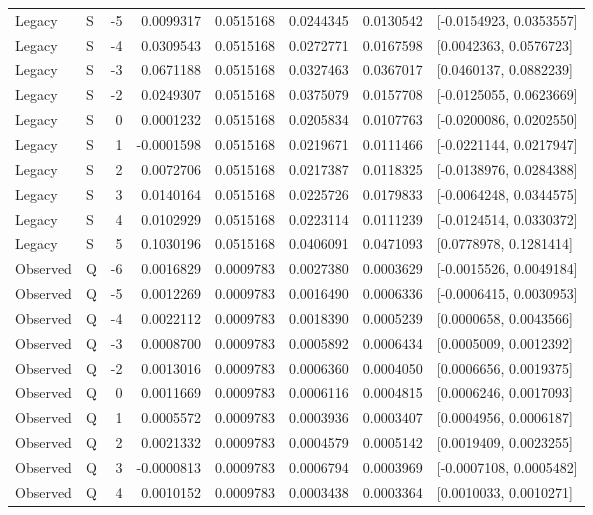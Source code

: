 {\begin{longtable}{llrrrrrl}
Legacy & S & -5 & 0.0099317 & 0.0515168 & 0.0244345 & 0.0130542 & [-0.0154923, 0.0353557]\\
Legacy & S & -4 & 0.0309543 & 0.0515168 & 0.0272771 & 0.0167598 & [0.0042363, 0.0576723]\\
Legacy & S & -3 & 0.0671188 & 0.0515168 & 0.0327463 & 0.0367017 & [0.0460137, 0.0882239]\\
Legacy & S & -2 & 0.0249307 & 0.0515168 & 0.0375079 & 0.0157708 & [-0.0125055, 0.0623669]\\
Legacy & S & 0 & 0.0001232 & 0.0515168 & 0.0205834 & 0.0107763 & [-0.0200086, 0.0202550]\\
Legacy & S & 1 & -0.0001598 & 0.0515168 & 0.0219671 & 0.0111466 & [-0.0221144, 0.0217947]\\
Legacy & S & 2 & 0.0072706 & 0.0515168 & 0.0217387 & 0.0118325 & [-0.0138976, 0.0284388]\\
Legacy & S & 3 & 0.0140164 & 0.0515168 & 0.0225726 & 0.0179833 & [-0.0064248, 0.0344575]\\
Legacy & S & 4 & 0.0102929 & 0.0515168 & 0.0223114 & 0.0111239 & [-0.0124514, 0.0330372]\\
Legacy & S & 5 & 0.1030196 & 0.0515168 & 0.0406091 & 0.0471093 & [0.0778978, 0.1281414]\\
Observed & Q & -6 & 0.0016829 & 0.0009783 & 0.0027380 & 0.0003629 & [-0.0015526, 0.0049184]\\
Observed & Q & -5 & 0.0012269 & 0.0009783 & 0.0016490 & 0.0006336 & [-0.0006415, 0.0030953]\\
Observed & Q & -4 & 0.0022112 & 0.0009783 & 0.0018390 & 0.0005239 & [0.0000658, 0.0043566]\\
Observed & Q & -3 & 0.0008700 & 0.0009783 & 0.0005892 & 0.0006434 & [0.0005009, 0.0012392]\\
Observed & Q & -2 & 0.0013016 & 0.0009783 & 0.0006360 & 0.0004050 & [0.0006656, 0.0019375]\\
Observed & Q & 0 & 0.0011669 & 0.0009783 & 0.0006116 & 0.0004815 & [0.0006246, 0.0017093]\\
Observed & Q & 1 & 0.0005572 & 0.0009783 & 0.0003936 & 0.0003407 & [0.0004956, 0.0006187]\\
Observed & Q & 2 & 0.0021332 & 0.0009783 & 0.0004579 & 0.0005142 & [0.0019409, 0.0023255]\\
Observed & Q & 3 & -0.0000813 & 0.0009783 & 0.0006794 & 0.0003969 & [-0.0007108, 0.0005482]\\
Observed & Q & 4 & 0.0010152 & 0.0009783 & 0.0003438 & 0.0003364 & [0.0010033, 0.0010271]\\

\end{longtable}}
